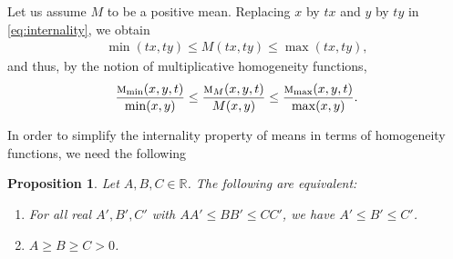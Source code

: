 \documentclass{amsart}
\theoremstyle{plain}
\newtheorem{proposition}{Proposition}
\numberwithin{equation}{section}
\newcommand{\mh}{\textsc{m}}
\begin{document}
Let us assume $M$ to be a positive mean. 
Replacing $x$ by $tx$ and $y$ by $ty$ in \eqref{eq:internality}, we obtain
\begin{align*}
\min(tx,ty) \leq M(tx,ty) \leq \max(tx,ty),
\end{align*}
and thus, by the notion of multiplicative homogeneity functions,
\begin{align*}
\frac{\mh_{\min} (x,y,t)}{\min(x,y)} \leq\frac{\mh_{M} (x,y,t)}{M(x,y)}
\leq \frac{\mh_{\max} (x,y,t)}{\max(x,y)}.
\end{align*}

\iffalse
In order to simplify the internality property of means
in terms of homogeneity functions,
we need the following
\begin{proposition}
Let \(A, B, C \in \mathbb{R}\). The following are equivalent:
\begin{enumerate}
    \item For all real \(A', B', C'\) with \(A A' \le B B' \le C C'\), we have \(A' \le B' \le C'\).
    \item \(A \ge B \ge C > 0\).
\end{enumerate}
\end{proposition}
\end{document}
